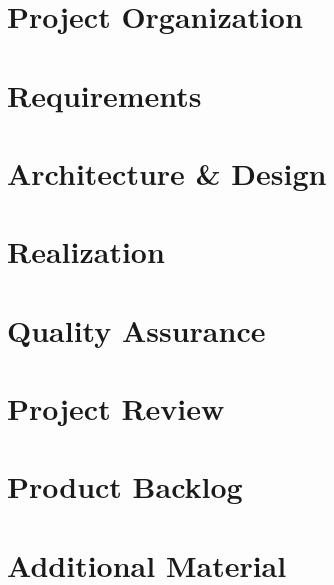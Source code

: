 \documentclass[a4paper,12pt,twoside,BCOR=15mm,parskip=half*]{scrartcl}
\begin{document}





\cleardoubleemptypage
\tableofcontents

\clearpage
\listoffigures
\listoftables

\clearpage
\section{Project Organization}


\clearpage
\section{Requirements}


\clearpage
\section{Architecture \& Design}


\clearpage
\section{Realization}


\clearpage

\clearpage

\clearpage

\clearpage


\clearpage
\section{Quality Assurance}


\clearpage
\section{Project Review}


\clearpage


\clearpage
\appendix
\section{Product Backlog}


\clearpage
\section{Additional Material}


\clearpage

\end{document}

